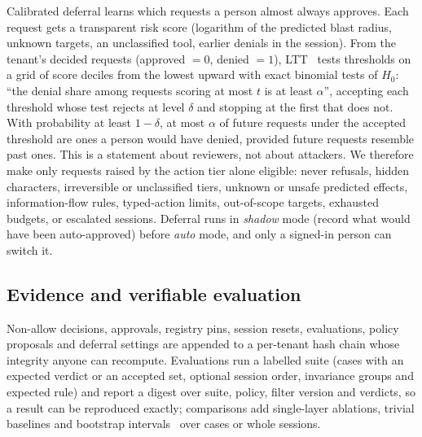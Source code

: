 Calibrated deferral learns which requests a person almost always approves. Each request gets a transparent risk score (logarithm of the predicted blast radius, unknown targets, an unclassified tool, earlier denials in the session). From the tenant's decided requests (approved $=0$, denied $=1$), LTT~\cite{ltt} tests thresholds on a grid of score deciles from the lowest upward with exact binomial tests of $H_0$: ``the denial share among requests scoring at most $t$ is at least $\alpha$'', accepting each threshold whose test rejects at level $\delta$ and stopping at the first that does not. With probability at least $1-\delta$, at most $\alpha$ of future requests under the accepted threshold are ones a person would have denied, provided future requests resemble past ones. This is a statement about reviewers, not about attackers. We therefore make only requests raised by the action tier alone eligible: never refusals, hidden characters, irreversible or unclassified tiers, unknown or unsafe predicted effects, information-flow rules, typed-action limits, out-of-scope targets, exhausted budgets, or escalated sessions. Deferral runs in \emph{shadow} mode (record what would have been auto-approved) before \emph{auto} mode, and only a signed-in person can switch it.

\subsection{Evidence and verifiable evaluation}
Non-allow decisions, approvals, registry pins, session resets, evaluations, policy proposals and deferral settings are appended to a per-tenant hash chain whose integrity anyone can recompute. Evaluations run a labelled suite (cases with an expected verdict or an accepted set, optional session order, invariance groups and expected rule) and report a digest over suite, policy, filter version and verdicts, so a result can be reproduced exactly; comparisons add single-layer ablations, trivial baselines and bootstrap intervals~\cite{efron} over cases or whole sessions.
